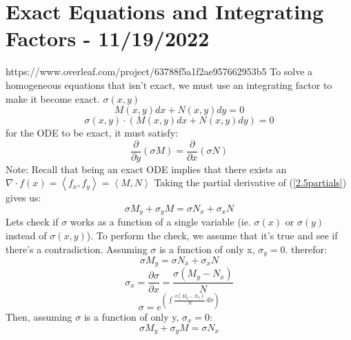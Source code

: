 \documentclass{report}
\begin{document}
    \section{Exact Equations and Integrating Factors - 11/19/2022}https://www.overleaf.com/project/63788f5a1f2ae957662953b5
        To solve a homogeneous equations that isn't exact, we must use an integrating factor to make it become exact.
        $\sigma(x,y)$
        \begin{equation}
             M(x,y)dx + N(x,y)dy = 0 
        \end{equation}
        \begin{equation}
             \sigma(x,y)\cdot(M(x,y)dx + N(x,y)dy) = 0
        \end{equation}
        for the ODE to be exact, it must satisfy:
        \begin{equation}
            \label{2.5partials}
            \frac{\partial }{\partial y} \left( \sigma M \right) =
            \frac{\partial }{\partial x} \left( \sigma N \right)
        \end{equation}
        Note: Recall that being an exact ODE implies that there exists an $\nabla \cdot f(x) = \left\langle f_x, f_y \right\rangle = \left\langle M, N \right\rangle$ \linebreak 
        Taking the partial derivative of (\ref{2.5partials}) gives us:
        \begin{equation}
            \sigma M_y + \sigma_y M = \sigma N_x + \sigma_x N
        \end{equation}
        Lets check if $\sigma$ works as a function of a single variable (ie. $\sigma(x)$ or $\sigma(y)$ instead of $\sigma(x, y)$). To perform the check, we assume that it's true and see if there's a contradiction. Assuming $\sigma$ is a function of only x, $\sigma_y = 0$. therefor:
        \begin{equation}
            \sigma M_y = \sigma N_x + \sigma_x N
        \end{equation}
        \begin{equation}
            \sigma_x  = 
            \frac{\partial \sigma}{\partial x} = 
            \frac{\sigma(M_y - N_x)}{N} 
        \end{equation}
        \begin{equation}
            \sigma = e^{\textstyle  (\int \frac{\sigma(M_y - N_x)}{N} \,dx)}
        \end{equation}
        Then, assuming $\sigma$ is a function of only y, $\sigma_x = 0$:
        \begin{equation}
            \sigma M_y + \sigma_y M = \sigma N_x
        \end{equation}
\end{document}
